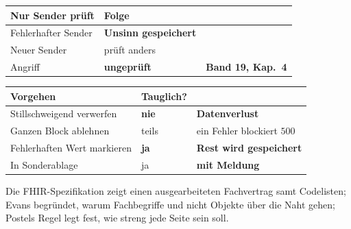 \begin{aufgabe}
\begin{center}
\renewcommand{\arraystretch}{1.45}
\begin{tabular}{@{}P{3.0cm}P{2.2cm}P{2.8cm}@{}}
\toprule
\textbf{Nur Sender prüft} & \textbf{Folge} & \\
\midrule
Fehlerhafter Sender & \textcolor{akzent}{\textbf{Unsinn gespeichert}} & \\
Neuer Sender & \textcolor{akzent}{prüft anders} & \\
Angriff & \textcolor{akzent}{\textbf{ungeprüft}} & \textbf{Band 19, Kap.~4}\\
\bottomrule
\end{tabular}
\end{center}

\begin{center}
\end{center}

\begin{warnung}
\begin{center}
\renewcommand{\arraystretch}{1.5}
\begin{tabular}{@{}P{3.0cm}P{2.2cm}P{2.8cm}@{}}
\toprule
\textbf{Vorgehen} & \textbf{Tauglich?} & \\
\midrule
Stillschweigend verwerfen & \textcolor{akzent}{\textbf{nie}} & \textcolor{akzent}{\textbf{Datenverlust}}\\
Ganzen Block ablehnen & \textcolor{mittel}{teils} & \textcolor{akzent}{ein Fehler blockiert $500$}\\
Fehlerhaften Wert markieren & \textcolor{gruen}{\textbf{ja}} & \textcolor{gruen}{\textbf{Rest wird gespeichert}}\\
In Sonderablage & \textcolor{gruen}{ja} & \textbf{mit Meldung}\\
\bottomrule
\end{tabular}
\end{center}

\begin{center}
\begin{minipage}{0.88\textwidth}
\end{minipage}
\end{center}

\begin{center}
\end{center}
\end{warnung}
\end{aufgabe}
\vspace{-4pt}
\noindent Die FHIR-Spe\-zi\-fi\-ka\-tion zeigt einen aus\-ge\-ar\-bei\-te\-ten Fach\-ver\-trag samt Code\-lis\-ten; Evans begründet, warum Fach\-be\-grif\-fe und nicht Ob\-jek\-te über die Naht gehen; Postels Regel legt fest, wie streng jede Seite sein soll.

